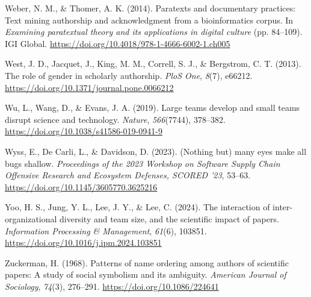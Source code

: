 \documentclass[
  number,
  3p,
  onecolumn]{elsarticle}
\newlength{\cslhangindent}
\newenvironment{CSLReferences}[2] %
 {\begin{list}{}{%
  \setlength{\itemindent}{0pt}
  \setlength{\leftmargin}{0pt}
  \setlength{\parsep}{0pt}
  \ifodd #1
   \setlength{\leftmargin}{\cslhangindent}
   \setlength{\itemindent}{-1\cslhangindent}
  \fi
  \setlength{\itemsep}{#2\baselineskip}}}
 {\end{list}}
\begin{document}
\begin{CSLReferences}{1}{0}
Weber, N. M., \& Thomer, A. K. (2014). Paratexts and documentary
practices: Text mining authorship and acknowledgment from a
bioinformatics corpus. In \emph{Examining paratextual theory and its
applications in digital culture} (pp. 84--109). IGI Global.
\url{https://doi.org/10.4018/978-1-4666-6002-1.ch005}

West, J. D., Jacquet, J., King, M. M., Correll, S. J., \& Bergstrom, C.
T. (2013). The role of gender in scholarly authorship. \emph{PloS One},
\emph{8}(7), e66212. \url{https://doi.org/10.1371/journal.pone.0066212}

Wu, L., Wang, D., \& Evans, J. A. (2019). Large teams develop and small
teams disrupt science and technology. \emph{Nature}, \emph{566}(7744),
378--382. \url{https://doi.org/10.1038/s41586-019-0941-9}

Wyss, E., De Carli, L., \& Davidson, D. (2023). (Nothing but) many eyes
make all bugs shallow. \emph{Proceedings of the 2023 Workshop on
Software Supply Chain Offensive Research and Ecosystem Defenses, SCORED
'23}, 53--63. \url{https://doi.org/10.1145/3605770.3625216}

Yoo, H. S., Jung, Y. L., Lee, J. Y., \& Lee, C. (2024). The interaction
of inter-organizational diversity and team size, and the scientific
impact of papers. \emph{Information Processing \& Management},
\emph{61}(6), 103851. \url{https://doi.org/10.1016/j.ipm.2024.103851}

Zuckerman, H. (1968). Patterns of name ordering among authors of
scientific papers: A study of social symbolism and its ambiguity.
\emph{American Journal of Sociology}, \emph{74}(3), 276--291.
\url{https://doi.org/10.1086/224641}

\end{CSLReferences}
\end{document}
